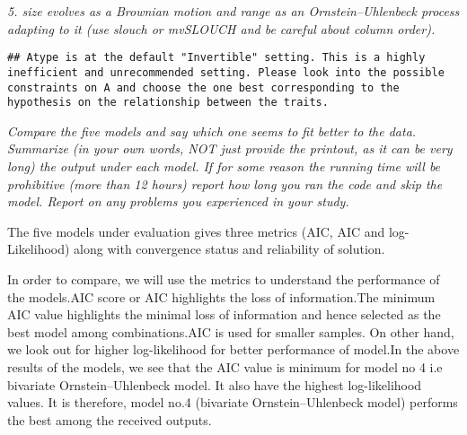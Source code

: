 \documentclass[
]{article}
\newenvironment{Shaded}{\begin{snugshade}}{\end{snugshade}}
\newcommand{\AttributeTok}[1]{\textcolor[rgb]{0.77,0.63,0.00}{#1}}
\newcommand{\CommentTok}[1]{\textcolor[rgb]{0.56,0.35,0.01}{\textit{#1}}}
\newcommand{\DecValTok}[1]{\textcolor[rgb]{0.00,0.00,0.81}{#1}}
\newcommand{\FunctionTok}[1]{\textcolor[rgb]{0.00,0.00,0.00}{#1}}
\newcommand{\NormalTok}[1]{#1}
\newcommand{\OtherTok}[1]{\textcolor[rgb]{0.56,0.35,0.01}{#1}}
\newcommand{\SpecialCharTok}[1]{\textcolor[rgb]{0.00,0.00,0.00}{#1}}
\begin{document}
\emph{5. size evolves as a Brownian motion and range as an
Ornstein--Uhlenbeck process adapting to it (use slouch or mvSLOUCH and
be careful about column order).}

\begin{Shaded}
\end{Shaded}

\begin{verbatim}
## Atype is at the default "Invertible" setting. This is a highly inefficient and unrecommended setting. Please look into the possible constraints on A and choose the one best corresponding to the hypothesis on the relationship between the traits.
\end{verbatim}

\emph{Compare the ﬁve models and say which one seems to ﬁt better to the
data. Summarize (in your own words, NOT just provide the printout, as it
can be very long) the output under each model. If for some reason the
running time will be prohibitive (more than 12 hours) report how long
you ran the code and skip the model. Report on any problems you
experienced in your study.}

The five models under evaluation gives three metrics (AIC, AIC and
log-Likelihood) along with convergence status and reliability of
solution.

In order to compare, we will use the metrics to understand the
performance of the models.AIC score or AIC highlights the loss of
information.The minimum AIC value highlights the minimal loss of
information and hence selected as the best model among combinations.AIC
is used for smaller samples. On other hand, we look out for higher
log-likelihood for better performance of model.In the above results of
the models, we see that the AIC value is minimum for model no 4 i.e
bivariate Ornstein--Uhlenbeck model. It also have the highest
log-likelihood values. It is therefore, model no.4 (bivariate
Ornstein--Uhlenbeck model) performs the best among the received outputs.
\end{document}
